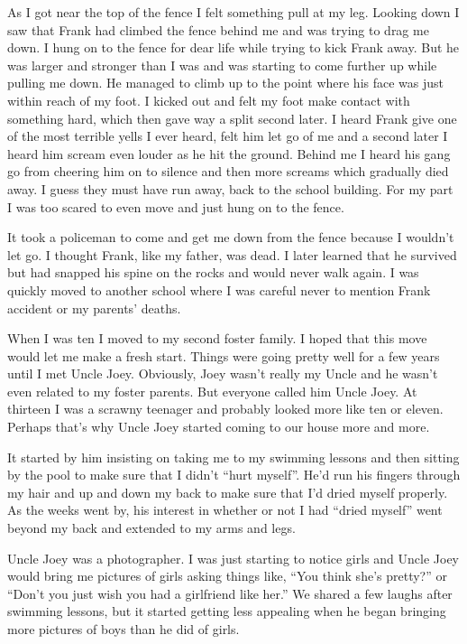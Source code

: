 \documentclass[12pt,letterpaper]{article}
\begin{document}
As I got near the top of the fence I felt something pull at my leg. Looking down I saw that Frank had climbed the fence behind me and was trying to drag me down. I hung on to the fence for dear life while trying to kick Frank away. But he was larger and stronger than I was and was starting to come further up while pulling me down. He managed to climb up to the point where his face was just within reach of my foot. I kicked out and felt my foot make contact with something hard, which then gave way a split second later. I heard Frank give one of the most terrible yells I ever heard, felt him let go of me and a second later I heard him scream even louder as he hit the ground. Behind me I heard his gang go from cheering him on to silence and then more screams which gradually died away. I guess they must have run away, back to the school building. For my part I was too scared to even move and just hung on to the fence.

It took a policeman to come and get me down from the fence because I wouldn't let go. I thought Frank, like my father, was dead. I later learned that he survived but had snapped his spine on the rocks and would never walk again. I was quickly moved to another school where I was careful never to mention Frank accident or my parents' deaths.

\vspace{1in}

When I was ten I moved to my second foster family. I hoped that this move would let me make a fresh start. Things were going pretty well for a few years until I met Uncle Joey. Obviously, Joey wasn't really my Uncle and he wasn't even related to my foster parents. But everyone called him Uncle Joey. At thirteen I was a scrawny teenager and probably looked more like ten or eleven. Perhaps that's why Uncle Joey started coming to our house more and more.

It started by him insisting on taking me to my swimming lessons and then sitting by the pool to make sure that I didn't ``hurt myself''. He'd run his fingers through my hair and up and down my back to make sure that I'd dried myself properly. As the weeks went by, his interest in whether or not I had ``dried myself'' went beyond my back and extended to my arms and legs.

Uncle Joey was a photographer. I was just starting to notice girls and Uncle Joey would bring me pictures of girls asking things like, ``You think she's pretty?'' or ``Don't you just wish you had a girlfriend like her.'' We shared a few laughs after swimming lessons, but it started getting less appealing when he began bringing more pictures of boys than he did of girls.
\end{document}
